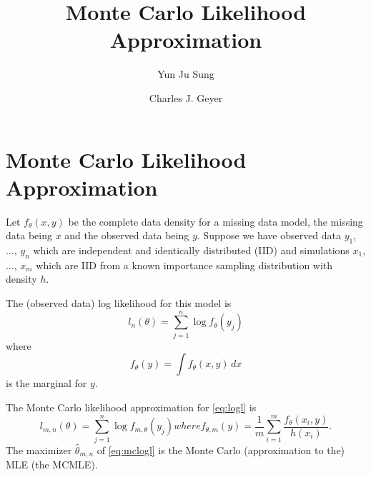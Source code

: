 \documentclass{article}
\begin{document}
\title{Monte Carlo Likelihood Approximation}

\author{Yun Ju Sung \and Charles J. Geyer}

\maketitle

\tableofcontents

\section{Monte Carlo Likelihood Approximation}

Let $f_\theta(x, y)$ be the complete data density for a missing data model,
the missing data being $x$ and the observed data being $y$.
Suppose we have observed data $y_1$, $\ldots$, $y_n$ which are
independent and identically distributed (IID) and
simulations $x_1$, $\ldots$, $x_m$ which are IID from a known importance
sampling distribution with density $h$.

The (observed data) log likelihood for this model is
\begin{equation} \label{eq:logl}
   l_n(\theta) = \sum_{j = 1}^n \log f_\theta(y_j)
\end{equation}
where
$$
   f_\theta(y) = \int f_\theta(x, y) \, d x
$$
is the marginal for $y$.

The Monte Carlo likelihood approximation for \eqref{eq:logl} is
\begin{subequations}
\begin{equation} \label{eq:mclogl}
   l_{m, n}(\theta)
   =
   \sum_{j = 1}^n \log f_{m, \theta}(y_j)
\end{equation}
where
\begin{equation} \label{eq:mcmarg}
   f_{\theta, m}(y)
   =
   \frac{1}{m} \sum_{i = 1}^m \frac{f_\theta(x_i, y)}{h(x_i)}.
\end{equation}
\end{subequations}
The maximizer $\hat{\theta}_{m, n}$ of \eqref{eq:mclogl} is the Monte Carlo
(approximation to the) MLE (the MCMLE).
\end{document}
